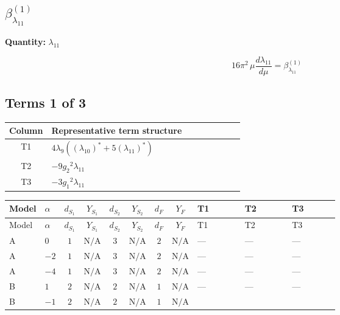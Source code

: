 \documentclass[8pt]{article}
\begin{document}
\begin{landscape}
\section*{$\beta_{\lambda_{11}}^{(1)}$}
\noindent\textbf{Quantity: }$\lambda_{11}$\par\smallskip
\[16\pi^2\,\mu\frac{d \lambda_{11}}{d\mu}=\beta_{\lambda_{11}}^{(1)}\]
\subsection*{Terms 1 of 3}
\begin{center}
\begin{tabular}{@{}c >{\raggedright\arraybackslash}p{0.82\linewidth}@{}}
\toprule
Column & Representative term structure \\
\midrule
T1 & \(\displaystyle 4 {\lambda_{9}} (\left({\lambda_{10}}\right)^{*}+5 \left({\lambda_{11}}\right)^{*})\) \\
\midrule
T2 & \(\displaystyle -9 {g_2}^2 {\lambda_{11}}\) \\
\midrule
T3 & \(\displaystyle -3 {g_1}^2 {\lambda_{11}}\) \\
\midrule
\bottomrule
\end{tabular}
\end{center}
\smallskip
\tiny
\begin{longtable}{@{}llcccccc >{\raggedright\arraybackslash}p{0.21\linewidth} >{\raggedright\arraybackslash}p{0.21\linewidth} >{\raggedright\arraybackslash}p{0.21\linewidth}@{}}
\toprule
Model & $\alpha$ & $d_{S_1}$ & $Y_{S_1}$ & $d_{S_2}$ & $Y_{S_2}$ & $d_F$ & $Y_F$ & T1 & T2 & T3 \\
\midrule
\endfirsthead
\toprule
Model & $\alpha$ & $d_{S_1}$ & $Y_{S_1}$ & $d_{S_2}$ & $Y_{S_2}$ & $d_F$ & $Y_F$ & T1 & T2 & T3 \\
\midrule
\endhead
A & $0$ & $1$ & $\text{N/A}$ & $3$ & $\text{N/A}$ & $2$ & $\text{N/A}$ & --- & --- & --- \\
\midrule
A & $-2$ & $1$ & $\text{N/A}$ & $3$ & $\text{N/A}$ & $2$ & $\text{N/A}$ & --- & --- & --- \\
\midrule
A & $-4$ & $1$ & $\text{N/A}$ & $3$ & $\text{N/A}$ & $2$ & $\text{N/A}$ & --- & --- & --- \\
\midrule
B & $1$ & $2$ & $\text{N/A}$ & $2$ & $\text{N/A}$ & $1$ & $\text{N/A}$ & --- & --- & --- \\
\midrule
B & $-1$ & $2$ & $\text{N/A}$ & $2$ & $\text{N/A}$ & $1$ & $\text{N/A}$ & \scriptsize\adjustbox{max width=\linewidth}{$\begin{gathered} 4 {\lambda_{9}} (\left({\lambda_{10}}\right)^{*}+5 \left({\lambda_{11}}\right)^{*})\end{gathered}$} & \scriptsize\adjustbox{max width=\linewidth}{$\begin{gathered} -9 {g_2}^2 {\lambda_{11}}\end{gathered}$} & \scriptsize\adjustbox{max width=\linewidth}{$\begin{gathered} -3 {g_1}^2 {\lambda_{11}}\end{gathered}$} \\

\end{longtable}
\end{landscape}
\end{document}
